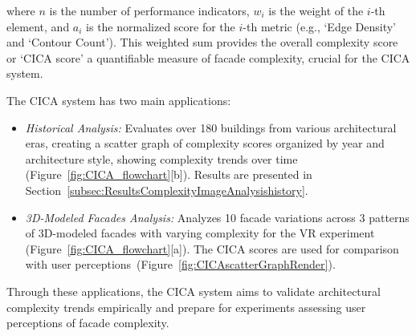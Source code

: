 where \(n\) is the number of performance indicators, \(w_i\) is the weight of the \(i\)-th element, and \(a_i\) is the normalized score for the \(i\)-th metric (e.g., `Edge Density' and `Contour Count').
This weighted sum provides the overall complexity score or `CICA score' a quantifiable measure of facade complexity, crucial for the CICA system.

The CICA system has two main applications:
\begin{itemize}
    \item \textit{Historical Analysis:} Evaluates over 180 buildings from various architectural eras, creating a scatter graph of complexity scores organized by year and architecture style, showing complexity trends over time (Figure~\ref{fig:CICA_flowchart}[b]). Results are presented in Section~\ref{subsec:ResultsComplexityImageAnalysishistory}.

    \item \textit{3D-Modeled Facades Analysis:} Analyzes 10 facade variations across 3 patterns of 3D-modeled facades with varying complexity for the VR experiment (Figure~\ref{fig:CICA_flowchart}[a]). The CICA scores are used for comparison with user perceptions~(Figure~\ref{fig:CICAscatterGraphRender}).
\end{itemize}

Through these applications, the CICA system aims to validate architectural complexity trends empirically and prepare for experiments assessing user perceptions of facade complexity.
